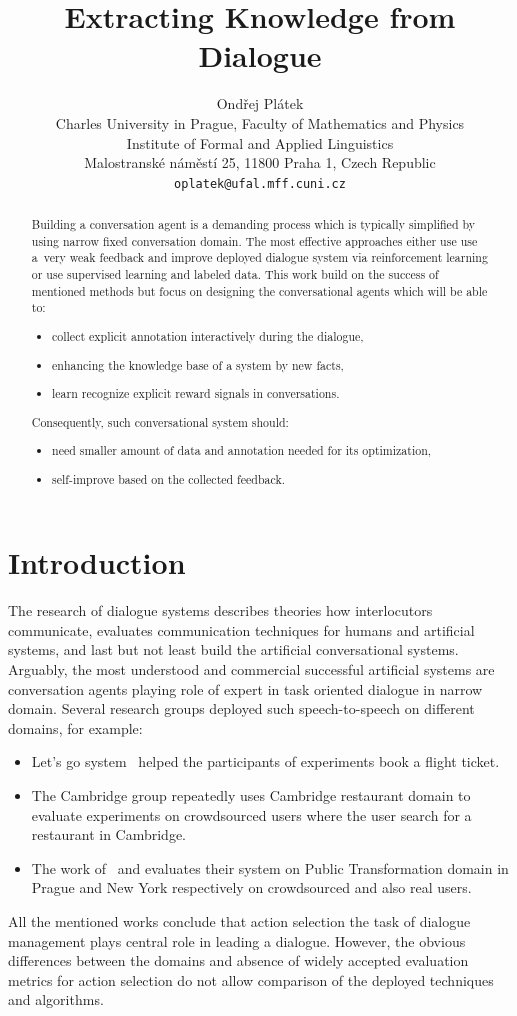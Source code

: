 \documentclass[11pt]{article}
\title{Extracting Knowledge from Dialogue}
\author{Ondřej Plátek \\
  Charles University in Prague, Faculty of Mathematics and Physics \\
  Institute of Formal and Applied Linguistics \\
  Malostranské náměstí 25, 11800 Praha 1, Czech Republic\\
  {\tt oplatek@ufal.mff.cuni.cz}\\}
\date{}
\begin{document}
\maketitle
\begin{abstract}
Building a conversation agent is a demanding process which is typically simplified by using narrow fixed conversation domain.
The most effective approaches either use use a~very weak feedback and improve deployed dialogue system via reinforcement learning or use supervised learning and labeled data.
This work build on the success of mentioned methods but focus on designing the conversational agents which will be able to:
\begin{itemize}
    \item collect explicit annotation interactively during the dialogue,
    \item enhancing the knowledge base of a system by new facts,
    \item learn recognize explicit reward signals in conversations.
\end{itemize}
Consequently, such conversational system should:
\begin{itemize}
    \item need smaller amount of data and annotation needed for its optimization,
    \item self-improve based on the collected feedback.
\end{itemize}
\end{abstract}

\section{Introduction}
\label{sec:introduction}

The research of dialogue systems describes theories how interlocutors communicate, evaluates communication techniques for humans and artificial systems, and last but not least build the artificial conversational systems.
Arguably, the most understood and commercial successful artificial systems are conversation agents playing role of expert in task oriented dialogue in narrow domain.
Several research groups deployed such speech-to-speech on different domains, for example:
\begin{itemize}
    \item Let's go system~\cite{raux_lets_2005} helped the participants of experiments book a flight ticket.
    \item The Cambridge group repeatedly uses Cambridge restaurant domain to evaluate experiments on crowdsourced users where the user search for a restaurant in Cambridge.
    \item The work of~\cite{dusek_sequence2sequence_2016} and \cite{vejman_martin_development_2015} evaluates their system on Public Transformation domain in Prague and New York respectively on crowdsourced and also real users. 
\end{itemize}
All the mentioned works conclude that action selection the task of dialogue management plays central role in leading a dialogue.
However, the obvious differences between the domains and absence of widely accepted evaluation metrics for action selection do not allow comparison of the deployed techniques and algorithms.
\end{document}
